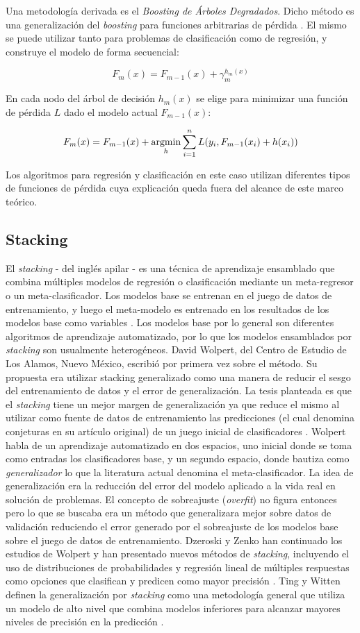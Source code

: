 Una metodología derivada es el \emph{Boosting de Árboles Degradados}. Dicho método es una generalización del \emph{boosting} para funciones arbitrarias de pérdida \cite{smolyakov}. El mismo se puede utilizar tanto para problemas de clasificación como de regresión, y construye el modelo de forma secuencial:

\[ F_m(x) = F_{m-1}(x) + \gamma_m^{h_m(x)} \]

En cada nodo del árbol de decisión \(h_m(x)\) se elige para minimizar una función de pérdida \(L\) dado el modelo actual \(F_{m-1}(x)\):

\[ F_m(x) = F_{m-1}(x) + \operatorname*{argmin}_h \sum_{i=1}^n L(y_i, F_{m-1}(x_i) + h(x_i) )\]

Los algoritmos para regresión y clasificación en este caso utilizan diferentes tipos de funciones de pérdida cuya explicación queda fuera del alcance de este marco teórico.

\subsection{Stacking}
El \emph{stacking} - del inglés apilar - es una técnica de aprendizaje ensamblado que combina múltiples modelos de regresión o clasificación mediante un meta-regresor o un meta-clasificador. Los modelos base se entrenan en el juego de datos de entrenamiento, y luego el meta-modelo es entrenado en los resultados de los modelos base como variables \cite{smolyakov}. Los modelos base por lo general son diferentes algoritmos de aprendizaje automatizado, por lo que los modelos ensamblados por \emph{stacking} son usualmente heterogéneos. David Wolpert, del Centro de Estudio de Los Alamos, Nuevo México, escribió por primera vez sobre el método. Su propuesta era utilizar stacking generalizado como una manera de reducir el sesgo del entrenamiento de datos y el error de generalización. La tesis planteada es que el \emph{stacking} tiene un mejor margen de generalización ya que reduce el mismo al utilizar como fuente de datos de entrenamiento las predicciones (el cual denomina conjeturas en su artículo original) de un juego inicial de clasificadores \cite{wolpert}. Wolpert habla de un aprendizaje automatizado en dos espacios, uno inicial donde se toma como entradas los clasificadores base, y un segundo espacio, donde bautiza como \emph{generalizador} lo que la literatura actual denomina el meta-clasificador. La idea de generalización era la reducción del error del modelo aplicado a la vida real en solución de problemas. El concepto de sobreajuste (\textit{overfit}) no figura entonces pero lo que se buscaba era un método que generalizara mejor sobre datos de validación reduciendo el error generado por el sobreajuste de los modelos base sobre el juego de datos de entrenamiento. Dzeroski y Zenko han continuado los estudios de Wolpert y han presentado nuevos métodos de \emph{stacking}, incluyendo el uso de distribuciones de probabilidades y regresión lineal de múltiples respuestas como opciones que clasifican y predicen como mayor precisión \cite{DzeroskiZenko}. Ting y Witten definen la generalización por \emph{stacking} como una metodología general que utiliza un modelo de alto nivel que combina modelos inferiores para alcanzar mayores niveles de precisión en la predicción \cite{tingwitten}.

